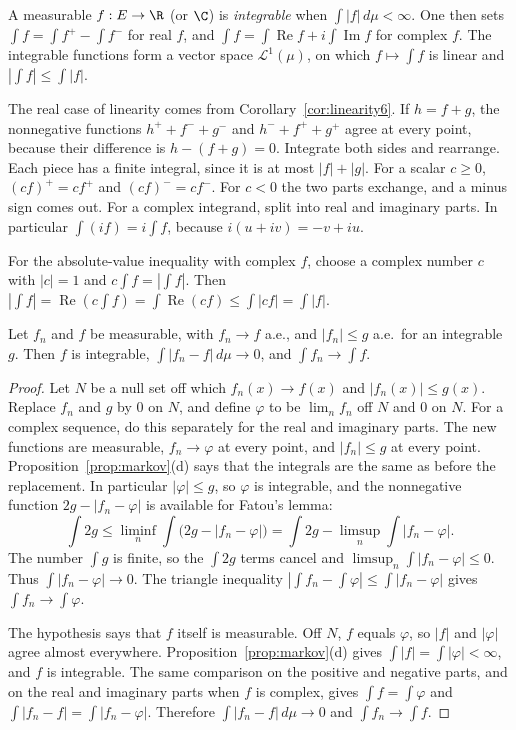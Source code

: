 \begin{definition}
A measurable \(f:E\to\R\) (or \(\C\)) is \emph{integrable} when \(\int|f|\,d\mu<\infty\). One then sets \(\int f=\int f^+-\int f^-\) for real \(f\), and \(\int f=\int\operatorname{Re}f+i\int\operatorname{Im}f\) for complex \(f\). The integrable functions
form a vector space \(\mathcal L^1(\mu)\), on which \(f\mapsto\int f\) is linear and \(|\int f|\le\int|f|\).
\end{definition}

The real case of linearity comes from Corollary~\ref{cor:linearity6}. If \(h=f+g\), the nonnegative functions \(h^++f^-+g^-\) and \(h^-+f^++g^+\) agree at every point, because their difference is \(h-(f+g)=0\). Integrate both sides and rearrange. Each piece has a finite integral, since it is at most \(|f|+|g|\). For a scalar \(c\ge0\), \((cf)^+=cf^+\) and \((cf)^-=cf^-\). For \(c<0\) the two parts exchange, and a minus sign comes out. For a complex integrand, split into real and imaginary parts. In particular \(\int(if)=i\int f\), because \(i(u+iv)=-v+iu\).

For the absolute-value inequality with complex \(f\), choose a complex number \(c\) with \(|c|=1\) and \(c\int f=|\int f|\). Then \(|\int f|=\operatorname{Re}(c\int f)=\int\operatorname{Re}(cf)\le\int|cf|=\int|f|\).

\begin{theorem}\label{thm:dct6}
Let \(f_n\) and \(f\) be measurable, with \(f_n\to f\) a.e., and \(|f_n|\le g\) a.e.\ for an integrable \(g\). Then \(f\) is integrable, \(\int|f_n-f|\,d\mu\to0\), and \(\int f_n\to\int f\).
\end{theorem}
\begin{proof}
Let \(N\) be a null set off which \(f_n(x)\to f(x)\) and \(|f_n(x)|\le g(x)\). Replace \(f_n\) and \(g\) by \(0\) on \(N\), and define \(\varphi\) to be \(\lim_nf_n\) off \(N\) and \(0\) on \(N\). For a complex sequence, do this separately for the real and imaginary parts. The new functions are measurable, \(f_n\to\varphi\) at every point, and \(|f_n|\le g\) at every point. Proposition~\ref{prop:markov}(d) says that the integrals are the same as before the replacement. In particular \(|\varphi|\le g\), so \(\varphi\) is integrable, and the nonnegative function \(2g-|f_n-\varphi|\) is available for Fatou's lemma:
\[
\int 2g\le\liminf_n\int\bigl(2g-|f_n-\varphi|\bigr)=\int 2g-\limsup_n\int|f_n-\varphi|.
\]
The number \(\int g\) is finite, so the \(\int 2g\) terms cancel and \(\limsup_n\int|f_n-\varphi|\le0\). Thus \(\int|f_n-\varphi|\to0\). The triangle inequality \(|\int f_n-\int\varphi|\le\int|f_n-\varphi|\) gives \(\int f_n\to\int\varphi\).

The hypothesis says that \(f\) itself is measurable. Off \(N\), \(f\) equals \(\varphi\), so \(|f|\) and \(|\varphi|\) agree almost everywhere. Proposition~\ref{prop:markov}(d) gives \(\int|f|=\int|\varphi|<\infty\), and \(f\) is integrable. The same comparison on the positive and negative parts, and on the real and imaginary parts when \(f\) is complex, gives \(\int f=\int\varphi\) and \(\int|f_n-f|=\int|f_n-\varphi|\). Therefore \(\int|f_n-f|\,d\mu\to0\) and \(\int f_n\to\int f\).
\end{proof}

